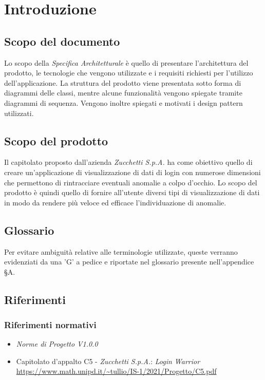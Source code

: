 \chapter{Introduzione}

\section{Scopo del documento}
Lo scopo della \textit{Specifica Architetturale} è quello di presentare l’architettura del prodotto, le tecnologie che vengono utilizzate e i requisiti richiesti per l'utilizzo dell'applicazione.  La struttura del prodotto viene presentata sotto forma di diagrammi delle classi, mentre alcune funzionalità vengono spiegate tramite diagrammi di sequenza. Vengono inoltre spiegati e motivati i design pattern utilizzati.

\section{Scopo del prodotto}
Il capitolato proposto dall'azienda \textit{Zucchetti S.p.A.} ha come obiettivo quello di creare un'applicazione di visualizzazione di dati di login con numerose dimensioni che permettono
di rintracciare eventuali anomalie a colpo d'occhio. Lo scopo del prodotto è quindi quello di fornire all'utente diversi tipi di visualizzazione di dati in modo da rendere
più veloce ed efficace l'individuazione di anomalie.

\section{Glossario}
Per evitare ambiguità relative alle terminologie utilizzate, queste verranno evidenziati da una 'G' a pedice e riportate nel glossario presente nell'appendice §A.

\section{Riferimenti}
\subsection{Riferimenti normativi}
\begin{itemize}
    \item \textit{Norme di Progetto V1.0.0}
    \item Capitolato d'appalto C5 - \textit{Zucchetti S.p.A.}: \textit{Login Warrior} \\
    \url{https://www.math.unipd.it/~tullio/IS-1/2021/Progetto/C5.pdf}
\end{itemize}

